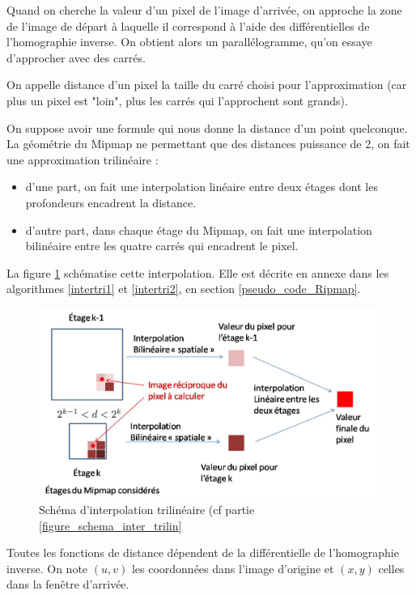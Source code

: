 Quand on cherche la valeur d'un pixel de l'image d'arrivée, on approche la zone de l'image de départ à laquelle il correspond à l'aide des différentielles de l'homographie inverse. On obtient alors un parallélogramme, qu'on essaye d'approcher avec des carrés. 


On appelle distance d'un pixel la taille du carré choisi pour l'approximation (car plus un pixel est "loin", plus les carrés qui l'approchent sont grands). 

On suppose avoir une formule qui nous donne la distance d'un point quelconque. La géométrie du Mipmap ne permettant que des distances puissance de 2, on fait une approximation trilinéaire : 

\begin{itemize}
  \item d'une part, on fait une interpolation linéaire entre deux étages dont les profondeurs encadrent la distance.
  \item d'autre part, dans chaque étage du Mipmap, on fait une interpolation bilinéaire entre les quatre carrés qui encadrent le pixel.
\end{itemize}

La figure \ref{intertrilineaire} schématise cette interpolation. Elle est décrite en annexe dans les algorithmes \ref{intertri1} et \ref{intertri2}, en section \ref{pseudo_code_Ripmap}.
\label{figure_schema_inter_trilin}
\begin{figure}[h!]
\centering
\includegraphics[scale=0.5]{intertrilineaire.jpg}
\caption{Schéma d'interpolation trilinéaire (cf partie \ref{figure_schema_inter_trilin}}
\label{intertrilineaire}
\end{figure}


\label{fonctiondistance}
Toutes les fonctions de distance dépendent de la différentielle de l'homographie inverse.
On note $(u,v)$ les coordonnées dans l'image d'origine et $(x,y)$ celles dans la fenêtre d'arrivée.

